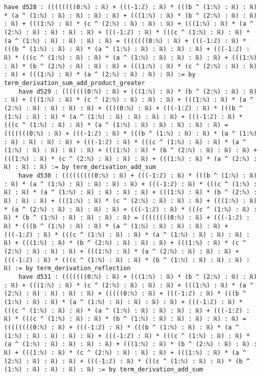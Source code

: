 \documentclass{article}
\begin{document}
\begin{tcolorbox}[colback=white!10, width=\linewidth]
\begin{lstlisting}[language=Lean4]
    have d528 : ((((((((0:ℕ) : ℝ) + (((-1:ℤ) : ℝ) * (((b ^ (1:ℕ) : ℝ) : ℝ) * (a ^ (1:ℕ) : ℝ) : ℝ) : ℝ) : ℝ) + (((1:ℕ) : ℝ) * (b ^ (2:ℕ) : ℝ) : ℝ) : ℝ) + (((1:ℕ) : ℝ) * (c ^ (2:ℕ) : ℝ) : ℝ) : ℝ) + (((1:ℕ) : ℝ) * (a ^ (2:ℕ) : ℝ) : ℝ) : ℝ) : ℝ) + (((-1:ℤ) : ℝ) * (((c ^ (1:ℕ) : ℝ) : ℝ) * (a ^ (1:ℕ) : ℝ) : ℝ) : ℝ) : ℝ) = (((((((0:ℕ) : ℝ) + (((-1:ℤ) : ℝ) * (((b ^ (1:ℕ) : ℝ) : ℝ) * (a ^ (1:ℕ) : ℝ) : ℝ) : ℝ) : ℝ) + (((-1:ℤ) : ℝ) * (((c ^ (1:ℕ) : ℝ) : ℝ) * (a ^ (1:ℕ) : ℝ) : ℝ) : ℝ) : ℝ) + (((1:ℕ) : ℝ) * (b ^ (2:ℕ) : ℝ) : ℝ) : ℝ) + (((1:ℕ) : ℝ) * (c ^ (2:ℕ) : ℝ) : ℝ) : ℝ) + (((1:ℕ) : ℝ) * (a ^ (2:ℕ) : ℝ) : ℝ) : ℝ) := by term_derivation_sum_add_product_greater
    have d529 : (((((((0:ℕ) : ℝ) + (((1:ℕ) : ℝ) * (b ^ (2:ℕ) : ℝ) : ℝ) : ℝ) + (((1:ℕ) : ℝ) * (c ^ (2:ℕ) : ℝ) : ℝ) : ℝ) + (((1:ℕ) : ℝ) * (a ^ (2:ℕ) : ℝ) : ℝ) : ℝ) : ℝ) + ((((0:ℕ) : ℝ) + (((-1:ℤ) : ℝ) * (((b ^ (1:ℕ) : ℝ) : ℝ) * (a ^ (1:ℕ) : ℝ) : ℝ) : ℝ) : ℝ) + (((-1:ℤ) : ℝ) * (((c ^ (1:ℕ) : ℝ) : ℝ) * (a ^ (1:ℕ) : ℝ) : ℝ) : ℝ) : ℝ) : ℝ) = (((((((0:ℕ) : ℝ) + (((-1:ℤ) : ℝ) * (((b ^ (1:ℕ) : ℝ) : ℝ) * (a ^ (1:ℕ) : ℝ) : ℝ) : ℝ) : ℝ) + (((-1:ℤ) : ℝ) * (((c ^ (1:ℕ) : ℝ) : ℝ) * (a ^ (1:ℕ) : ℝ) : ℝ) : ℝ) : ℝ) + (((1:ℕ) : ℝ) * (b ^ (2:ℕ) : ℝ) : ℝ) : ℝ) + (((1:ℕ) : ℝ) * (c ^ (2:ℕ) : ℝ) : ℝ) : ℝ) + (((1:ℕ) : ℝ) * (a ^ (2:ℕ) : ℝ) : ℝ) : ℝ) := by term_derivation_add_sum
    have d530 : (((((((((0:ℕ) : ℝ) + (((-1:ℤ) : ℝ) * (((b ^ (1:ℕ) : ℝ) : ℝ) * (a ^ (1:ℕ) : ℝ) : ℝ) : ℝ) : ℝ) + (((-1:ℤ) : ℝ) * (((c ^ (1:ℕ) : ℝ) : ℝ) * (a ^ (1:ℕ) : ℝ) : ℝ) : ℝ) : ℝ) + (((1:ℕ) : ℝ) * (b ^ (2:ℕ) : ℝ) : ℝ) : ℝ) + (((1:ℕ) : ℝ) * (c ^ (2:ℕ) : ℝ) : ℝ) : ℝ) + (((1:ℕ) : ℝ) * (a ^ (2:ℕ) : ℝ) : ℝ) : ℝ) : ℝ) + (((-1:ℤ) : ℝ) * (((c ^ (1:ℕ) : ℝ) : ℝ) * (b ^ (1:ℕ) : ℝ) : ℝ) : ℝ) : ℝ) = ((((((((0:ℕ) : ℝ) + (((-1:ℤ) : ℝ) * (((b ^ (1:ℕ) : ℝ) : ℝ) * (a ^ (1:ℕ) : ℝ) : ℝ) : ℝ) : ℝ) + (((-1:ℤ) : ℝ) * (((c ^ (1:ℕ) : ℝ) : ℝ) * (a ^ (1:ℕ) : ℝ) : ℝ) : ℝ) : ℝ) + (((1:ℕ) : ℝ) * (b ^ (2:ℕ) : ℝ) : ℝ) : ℝ) + (((1:ℕ) : ℝ) * (c ^ (2:ℕ) : ℝ) : ℝ) : ℝ) + (((1:ℕ) : ℝ) * (a ^ (2:ℕ) : ℝ) : ℝ) : ℝ) + (((-1:ℤ) : ℝ) * (((c ^ (1:ℕ) : ℝ) : ℝ) * (b ^ (1:ℕ) : ℝ) : ℝ) : ℝ) : ℝ) := by term_derivation_reflection
    have d531 : (((((((0:ℕ) : ℝ) + (((1:ℕ) : ℝ) * (b ^ (2:ℕ) : ℝ) : ℝ) : ℝ) + (((1:ℕ) : ℝ) * (c ^ (2:ℕ) : ℝ) : ℝ) : ℝ) + (((1:ℕ) : ℝ) * (a ^ (2:ℕ) : ℝ) : ℝ) : ℝ) : ℝ) + (((((0:ℕ) : ℝ) + (((-1:ℤ) : ℝ) * (((b ^ (1:ℕ) : ℝ) : ℝ) * (a ^ (1:ℕ) : ℝ) : ℝ) : ℝ) : ℝ) + (((-1:ℤ) : ℝ) * (((c ^ (1:ℕ) : ℝ) : ℝ) * (a ^ (1:ℕ) : ℝ) : ℝ) : ℝ) : ℝ) + (((-1:ℤ) : ℝ) * (((c ^ (1:ℕ) : ℝ) : ℝ) * (b ^ (1:ℕ) : ℝ) : ℝ) : ℝ) : ℝ) : ℝ) = ((((((((0:ℕ) : ℝ) + (((-1:ℤ) : ℝ) * (((b ^ (1:ℕ) : ℝ) : ℝ) * (a ^ (1:ℕ) : ℝ) : ℝ) : ℝ) : ℝ) + (((-1:ℤ) : ℝ) * (((c ^ (1:ℕ) : ℝ) : ℝ) * (a ^ (1:ℕ) : ℝ) : ℝ) : ℝ) : ℝ) + (((1:ℕ) : ℝ) * (b ^ (2:ℕ) : ℝ) : ℝ) : ℝ) + (((1:ℕ) : ℝ) * (c ^ (2:ℕ) : ℝ) : ℝ) : ℝ) + (((1:ℕ) : ℝ) * (a ^ (2:ℕ) : ℝ) : ℝ) : ℝ) + (((-1:ℤ) : ℝ) * (((c ^ (1:ℕ) : ℝ) : ℝ) * (b ^ (1:ℕ) : ℝ) : ℝ) : ℝ) : ℝ) := by term_derivation_add_sum

\end{lstlisting}
\end{tcolorbox}
\end{document}
